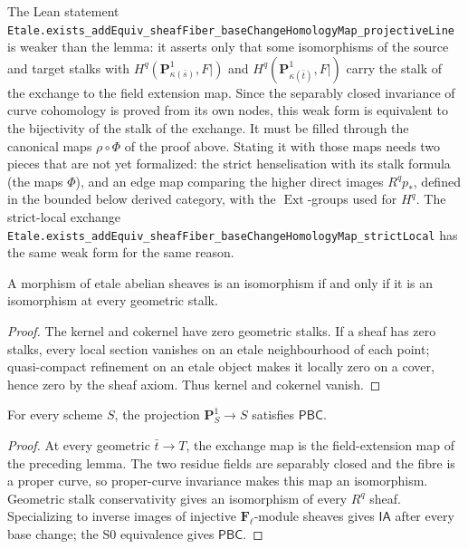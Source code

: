 \begin{remark}
The Lean statement
\texttt{Etale.exists\_addEquiv\_sheafFiber\_baseChangeHomologyMap\_projectiveLine}
is weaker than the lemma: it asserts only that some isomorphisms of the source
and target stalks with $H^q(\mathbf P^1_{\kappa(\bar s)},F|)$ and
$H^q(\mathbf P^1_{\kappa(\bar t)},F|)$ carry the stalk of the exchange to the
field extension map.  Since the separably closed invariance of curve
cohomology is proved from its own nodes, this weak form is equivalent to the
bijectivity of the stalk of the exchange.  It must be filled through the
canonical maps $\rho\circ\Phi$ of the proof above.  Stating it with those maps
needs two pieces that are not yet formalized: the strict henselisation with
its stalk formula (the maps $\Phi$), and an edge map comparing the higher
direct images $R^qp_*$, defined in the bounded below derived category, with
the $\operatorname{Ext}$-groups used for $H^q$.  The strict-local exchange
\texttt{Etale.exists\_addEquiv\_sheafFiber\_baseChangeHomologyMap\_strictLocal}
has the same weak form for the same reason.
\end{remark}

\begin{lemma}
\label{lemma:weil-pbc-geometric-stalk-conservative}
\uses{}
\leanok
A morphism of etale abelian sheaves is an isomorphism if and only if it is an
isomorphism at every geometric stalk.
\end{lemma}
\begin{proof}
\uses{} 
The kernel and cokernel have zero geometric stalks.  If a sheaf has zero
stalks, every local section vanishes on an etale neighbourhood of each point;
quasi-compact refinement on an etale object makes it locally zero on a cover,
hence zero by the sheaf axiom.  Thus kernel and cokernel vanish.
\end{proof}

\begin{proposition}
\label{prop:weil-pbc-projective-line}
\uses{}

For every scheme $S$, the projection $\mathbf P^1_S\to S$ satisfies
$\mathsf{PBC}$.
\end{proposition}
\begin{proof}

At every geometric $\bar t\to T$, the exchange map is the field-extension
map of the preceding lemma.  The two residue fields are separably closed and
the fibre is a proper curve, so proper-curve invariance makes this map an
isomorphism.  Geometric stalk conservativity gives an isomorphism of every
$R^q$ sheaf.  Specializing to inverse images of injective
$\mathbf F_\ell$-module sheaves gives $\mathsf{IA}$ after every base change;
the S0 equivalence gives $\mathsf{PBC}$.
\end{proof}

